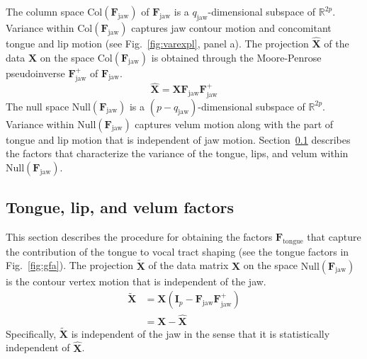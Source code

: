 \documentclass[reprint]{JASAnew}\usepackage[]{graphicx}\usepackage[]{color}
\begin{document}
The column space $\mathrm{Col}(\mathbf{F}_\text{jaw})$ of $\mathbf{F}_\text{jaw}$ is a $q_\text{jaw}$-dimensional subspace of $\mathbb{R}^{2p}$. 
%
Variance within $\mathrm{Col}(\mathbf{F}_\text{jaw})$ captures jaw contour motion and concomitant tongue and lip motion (see Fig.~\ref{fig:varexpl}, panel a).
%
The projection $\mathbf{\hat{X}}$ of the data $\mathbf{X}$ on the space $\mathrm{Col}(\mathbf{F}_\text{jaw})$ is obtained through the Moore-Penrose pseudoinverse $\mathbf{F}_\text{jaw}^+$ of $\mathbf{F}_\text{jaw}$. 
%
\begin{equation} \label{eq:XXuu}
\mathbf{\hat{X}} 
= \mathbf{X} 
  \mathbf{F}_\text{jaw}
  \mathbf{F}_\text{jaw}^+ 
\end{equation}
%
The null space $\mathrm{Null}(\mathbf{F}_\text{jaw})$ is a $(p-q_\text{jaw})$-dimensional subspace of $\mathbb{R}^{2p}$. 
% 
Variance within $\mathrm{Null}(\mathbf{F}_\text{jaw})$ captures velum motion along with the part of tongue and lip motion that is independent of jaw motion. 
%
Section~\ref{subsec:residfactors} describes the factors that characterize the variance of the tongue, lips, and velum within $\mathrm{Null} \left( \mathbf{F}_\text{jaw} \right)$. 





\subsection{Tongue, lip, and velum factors}
\label{subsec:residfactors}

This section describes the procedure for obtaining the factors $\mathbf{F}_\text{tongue}$ that capture the contribution of the tongue to vocal tract shaping  (see the tongue factors in Fig.~\ref{fig:gfa}). 
% 
The projection $\mathbf{\tilde{X}}$ of the data matrix $\mathbf{X}$ on the space $\mathrm{Null}(\mathbf{F}_\text{jaw})$ is the contour vertex motion that is independent of the jaw.
%
\begin{align} \label{eq:XXX}
\mathbf{\tilde{X}} 
&= \mathbf{X} \left( \mathbf{I}_p - \mathbf{F}_\text{jaw}\mathbf{F}_\text{jaw}^+ \right) \\
&= \mathbf{X} - \mathbf{\hat{X}} 
\end{align}
%
Specifically, $\mathbf{\tilde{X}}$ is independent of the jaw in the sense that it is statistically independent of $\mathbf{\hat{X}}$. 
%
\end{document}
